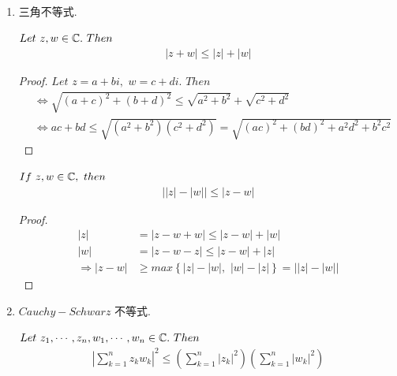 	\begin{enumerate}
		\item 三角不等式.
		\begin{proposition}
			$Let \,\, z , w \in \mathbb{C} . \,\, Then$
			\begin{align}
				\left| z + w \right| \leq \left| z \right| + \left| w \right|
			\end{align}
			
			\begin{proof}
				$Let \,\, z = a + bi , \,\, w = c + di . \,\, Then$
				\begin{align}
					&\Leftrightarrow \sqrt{(a + c)^2 + (b + d)^2} \leq \sqrt{a^2 + b^2} + \sqrt{c^2 + d^2} \\
					&\Leftrightarrow ac + bd \leq \sqrt{(a^2 + b^2)(c^2 + d^2)} = \sqrt{(ac)^2 + (bd)^2 + a^2 d^2 + b^2 c^2}
				\end{align}
			\end{proof}
		\end{proposition}
	
		\begin{corollary}
			$If \,\, z , w \in \mathbb{C} , \,\, then$
			\begin{align}
				\left| \left| z \right| - \left| w \right| \right| \leq \left| z - w \right|
			\end{align}
		
			\begin{proof}
				\begin{align}
					\left| z \right| &= \left| z - w + w \right| \leq \left| z - w \right| + \left| w \right| \\
					\left| w \right| &= \left| z - w - z \right| \leq \left| z - w \right| + \left| z \right| \\
					\Rightarrow \left| z - w \right| 
					&\geq max\left\{ \left| z \right| - \left| w \right| , \,\, \left| w \right| - \left| z \right| \right\} 
					= \left| \left| z \right| - \left| w \right| \right|
				\end{align}
			\end{proof}
		\end{corollary}
	
		\item $Cauchy - Schwarz$ 不等式.
		\begin{proposition}
			$Let \,\, z_1 , \cdots , z_n , w_1 , \cdots , w_n \in\mathbb{C} . \,\, Then$
			\begin{align}
				\left| \sum_{k = 1}^{n}{z_k w_k} \right|^2 \leq 
				\left( \sum_{k = 1}^{n}{\left| z_k \right|^2} \right)
				\left( \sum_{k = 1}^{n}{\left| w_k \right|^2} \right)
			\end{align}
		

\end{proposition}
\end{enumerate}
